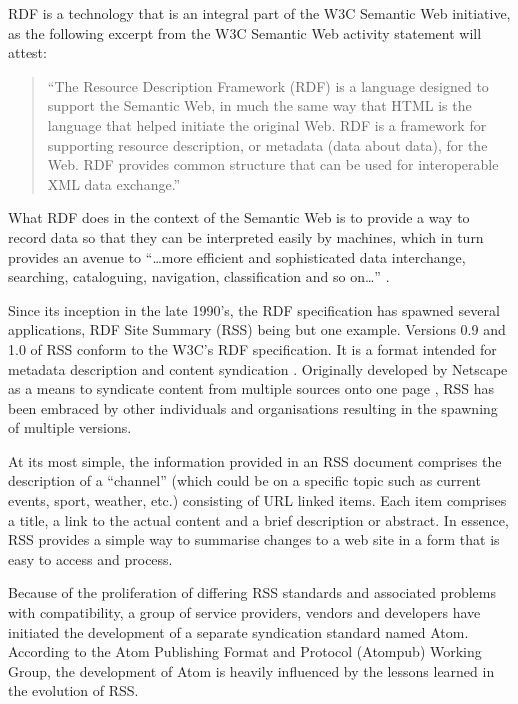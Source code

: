 \documentclass{CRPITStyle}
\begin{document}
RDF is a technology that is an integral part of the W3C Semantic Web
initiative, as the following excerpt from the W3C Semantic Web activity
statement will attest:

\begin{quotation}
	``The Resource Description Framework (RDF) is a language designed to
	support the Semantic Web, in much the same way that HTML is the
	language that helped initiate the original Web. RDF is a framework
	for supporting resource description, or metadata (data about data),
	for the Web. RDF provides common structure that can be used for
	interoperable XML data exchange.'' \cite{Powe-S-2003-RDF}
\end{quotation}

What RDF does in the context of the Semantic Web is to provide a way to
record data so that they can be interpreted easily by machines, which in
turn provides an avenue to ``\ldots{}more efficient and sophisticated
data interchange, searching, cataloguing, navigation, classification and
so on\ldots{}'' \cite{Powe-S-2003-RDF}.

Since its inception in the late 1990's, the RDF specification has
spawned several applications, RDF Site Summary (RSS) being but one
example. Versions 0.9 and 1.0 of RSS conform to the W3C's RDF
specification. It is a format intended for metadata description and
content syndication \cite{Mano-F-2004-RDF}. Originally developed by
Netscape as a means to syndicate content from multiple sources onto one
page \cite{Nott-M-2005-Atom}, RSS has been embraced by other individuals
and organisations resulting in the spawning of multiple versions.

At its most simple, the information provided in an RSS document
comprises the description of a ``channel'' (which could be on a specific
topic such as current events, sport, weather, etc.) consisting of URL
linked items. Each item comprises a title, a link to the actual content
and a brief description or abstract. In essence, RSS provides a simple
way to summarise changes to a web site in a form that is easy to access
and process.

Because of the proliferation of differing RSS standards and associated
problems with compatibility, a group of service providers, vendors and
developers have initiated the development of a separate syndication
standard named Atom. According to the Atom Publishing Format and
Protocol (Atompub) Working Group, the development of Atom is heavily
influenced by the lessons learned in the evolution of RSS.
\end{document}
